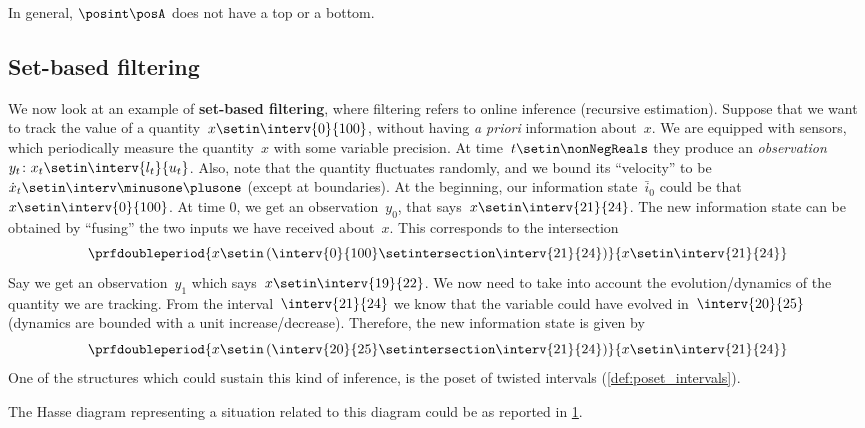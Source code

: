 In general, $\posint\posA$ does not have a top or a bottom.

\vfill
\clearpage

\subsection{Set-based filtering}
We now look at an example of \textbf{set-based filtering}, where filtering refers to online inference (recursive estimation).
Suppose that we want to track the value of a quantity~$x\setin \interv{0}{100}$, without having \emph{a priori} information about~$x$.
We are equipped with sensors, which periodically measure the quantity~$x$ with some variable precision.
At time~$t\setin \nonNegReals$ they produce an \emph{observation}~$y_t\colon x_t\setin \interv{l_t}{u_t}$.
Also, note that the quantity fluctuates randomly, and we bound its ``velocity'' to be~$\dot{x}_t\setin \interv\minusone\plusone$ (except at boundaries).
At the beginning, our information state~$\bar{i}_0$ could be that~$x\setin \interv{0}{100}$.
At time 0, we get an observation~$y_0$, that says~$x\setin \interv{21}{24}$.
The new information state can be obtained by ``fusing'' the two inputs we have received about~$x$.
This corresponds to the intersection
\begin{equation}\label{eq:filtering-2}
    \prfdoubleperiod{
        x\setin \left( \interv{0}{100} \setintersection \interv{21}{24}\right)
    }{
        x\setin \interv{21}{24}
    }
\end{equation}
Say we get an observation~$y_1$ which says~$x\setin \interv{19}{22}$.
We now need to take into account the evolution/dynamics of the quantity we are tracking.
From the interval~$\interv{21}{24}$ we know that the variable could have evolved in~$\interv{20}{25}$ (dynamics are bounded with a unit increase/decrease).
Therefore, the new information state is given by
\begin{equation}\label{eq:filtering-3}
    \prfdoubleperiod{
        x\setin \left( \interv{20}{25} \setintersection \interv{21}{24}\right)
    }{
        x\setin \interv{21}{24}
    }
\end{equation}
One of the structures which could sustain this kind of inference, is the poset of twisted intervals  (\cref{def:poset_intervals}).

The Hasse diagram representing a situation related to this diagram could be as reported in \cref{fig:hasse_filtering}.
\begin{figure}[h!]
    \centering
    \caption{}
    \label{fig:hasse_filtering}
\end{figure}
